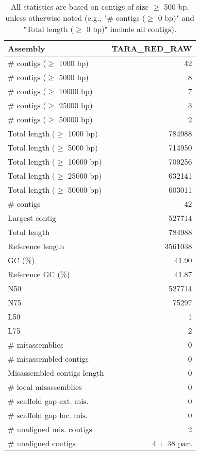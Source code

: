 \documentclass[12pt,a4paper]{article}
\begin{document}
\begin{table}[ht]
\begin{center}
\caption{All statistics are based on contigs of size $\geq$ 500 bp, unless otherwise noted (e.g., "\# contigs ($\geq$ 0 bp)" and "Total length ($\geq$ 0 bp)" include all contigs).}
\begin{tabular}{|l*{1}{|r}|}
\hline
Assembly & TARA\_RED\_RAW \\ \hline
\# contigs ($\geq$ 1000 bp) & 42 \\ \hline
\# contigs ($\geq$ 5000 bp) & 8 \\ \hline
\# contigs ($\geq$ 10000 bp) & 7 \\ \hline
\# contigs ($\geq$ 25000 bp) & 3 \\ \hline
\# contigs ($\geq$ 50000 bp) & 2 \\ \hline
Total length ($\geq$ 1000 bp) & 784988 \\ \hline
Total length ($\geq$ 5000 bp) & 714950 \\ \hline
Total length ($\geq$ 10000 bp) & 709256 \\ \hline
Total length ($\geq$ 25000 bp) & 632141 \\ \hline
Total length ($\geq$ 50000 bp) & 603011 \\ \hline
\# contigs & 42 \\ \hline
Largest contig & 527714 \\ \hline
Total length & 784988 \\ \hline
Reference length & 3561038 \\ \hline
GC (\%) & 41.90 \\ \hline
Reference GC (\%) & 41.87 \\ \hline
N50 & 527714 \\ \hline
N75 & 75297 \\ \hline
L50 & 1 \\ \hline
L75 & 2 \\ \hline
\# misassemblies & 0 \\ \hline
\# misassembled contigs & 0 \\ \hline
Misassembled contigs length & 0 \\ \hline
\# local misassemblies & 0 \\ \hline
\# scaffold gap ext. mis. & 0 \\ \hline
\# scaffold gap loc. mis. & 0 \\ \hline
\# unaligned mis. contigs & 2 \\ \hline
\# unaligned contigs & 4 + 38 part \\ \hline

\end{tabular}
\end{center}
\end{table}
\end{document}
